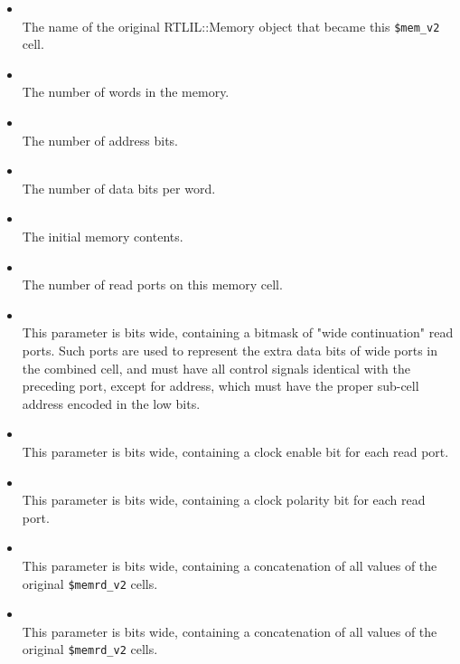 \begin{itemize}
\item {} \\
The name of the original RTLIL::Memory object that became this {\tt \$mem\_v2} cell.

\item {} \\
The number of words in the memory.

\item {} \\
The number of address bits.

\item {} \\
The number of data bits per word.

\item {} \\
The initial memory contents.

\item {} \\
The number of read ports on this memory cell.

\item {} \\
This parameter is  bits wide, containing a bitmask of "wide continuation" read ports.
Such ports are used to represent the extra data bits of wide ports in the combined cell, and must
have all control signals identical with the preceding port, except for address, which must have
the proper sub-cell address encoded in the low bits.

\item {} \\
This parameter is  bits wide, containing a clock enable bit for each read port.

\item {} \\
This parameter is  bits wide, containing a clock polarity bit for each read port.

\item {} \\
This parameter is  bits wide, containing a concatenation of all
 values of the original {\tt \$memrd\_v2} cells.

\item {} \\
This parameter is  bits wide, containing a concatenation of all
 values of the original {\tt \$memrd\_v2} cells.


\end{itemize}
